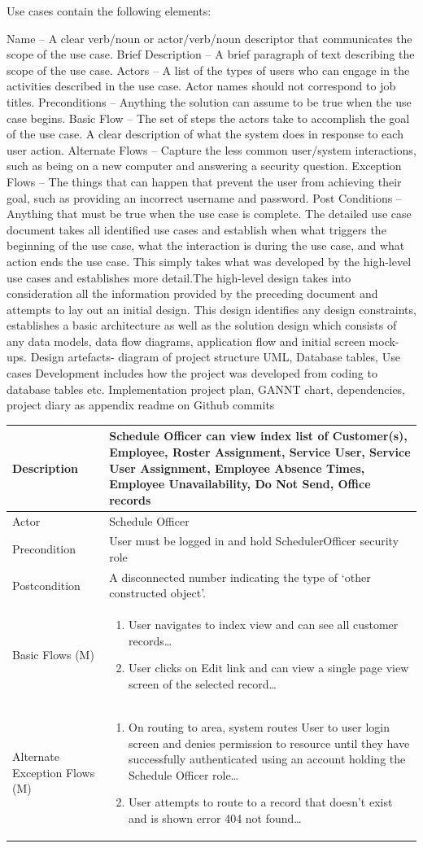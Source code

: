 \documentclass[a4paper,12pt]{article}
\newcommand\addrow[2]{#1 &#2\\ }
\newcommand\addheading[2]{#1 &#2\\ \hline}
\newcommand\tabularhead{\begin{tabular}{lp{8cm}}
\hline
}
\newcommand\addmulrow[2]{ \begin{minipage}[t][][t]{2.5cm}#1\end{minipage}%
   &\begin{minipage}[t][][t]{8cm}
    \begin{enumerate} #2   \end{enumerate}
    \end{minipage}\\ }
\newenvironment{usecase}{\tabularhead}
{\hline\end{tabular}}
\begin{document}
\begin{samepage}
Use cases contain the following elements:

Name – A clear verb/noun or actor/verb/noun descriptor that communicates the scope of the use case.
Brief Description – A brief paragraph of text describing the scope of the use case.
Actors – A list of the types of users who can engage in the activities described in the use case. Actor names should not correspond to job titles.
Preconditions – Anything the solution can assume to be true when the use case begins.
Basic Flow – The set of steps the actors take to accomplish the goal of the use case. A clear description of what the system does in response to each user action.
Alternate Flows – Capture the less common user/system interactions, such as being on a new computer and answering a security question.
Exception Flows – The things that can happen that prevent the user from achieving their goal, such as providing an incorrect username and password.
Post Conditions – Anything that must be true when the use case is complete.
The detailed use case document takes all identified use cases and establish when what triggers the
beginning of the use case, what the interaction is during the use case, and what action ends the use case.  This simply takes what
was developed by the high-level use cases and establishes more detail.The high-level design takes into consideration all the information provided by the preceding document and attempts to lay out an initial design.  This design identifies any design constraints, establishes a basic architecture as well as the solution design which consists of any data models, data flow diagrams, application flow and initial screen mock-ups. Design artefacts- diagram of project structure UML, Database tables, Use cases Development includes how the project was developed from coding to database tables etc. Implementation project plan, GANNT chart, dependencies, project diary as appendix readme on Github commits
\newpage
\begin{usecase}
  \addheading{Description}{Schedule Officer can view index list of Customer(s), Employee, Roster Assignment, Service User, Service User Assignment, Employee Absence Times, Employee Unavailability, Do Not Send, Office records}
  \addheading{Actor}{Schedule Officer} 
  \addrow{Precondition}{User must be logged in and hold SchedulerOfficer security role}
  \addrow{Postcondition}{A disconnected number indicating the type of `other constructed object'.}
  \addmulrow{Basic Flows (M)}{\item User navigates to index view and can see all customer records\ldots
                                  \item User clicks on Edit link and can view a single page view screen of the selected record\ldots}
  \addmulrow{Alternate Exception Flows (M)}{\item On routing to area, system routes User to user login screen and denies permission to resource until they have successfully authenticated using an account holding the Schedule Officer role\ldots
                                   \item User attempts to route to a record that doesn't exist and is shown error 404 not found\ldots}
\end{usecase}



\end{samepage}
\end{document}
